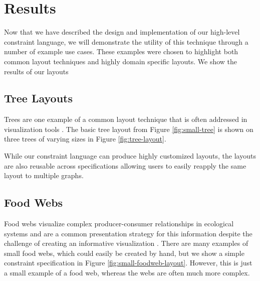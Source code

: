 \section{Results}
Now that we have described the design and implementation of our high-level constraint language, we will demonstrate the utility of this technique through a number of example use cases. These examples were chosen to highlight both common layout techniques and highly domain specific layouts. We show the results of our layouts 



\subsection{Tree Layouts}
\treeLayout
\tlrFourLayout
Trees are one example of a common layout technique that is often addressed in visualization tools . The basic tree layout from Figure \ref{fig:small-tree} is shown on three trees of varying sizes in Figure \ref{fig:tree-layout}.

While our constraint language can produce highly customized layouts, the layouts are also reusable across specifications allowing users to easily reapply the same layout to multiple graphs.

\subsection{Food Webs}
\smallFoodWebLayout
Food webs visualize complex producer-consumer relationships in ecological systems and are a common presentation strategy for this information despite the challenge of creating an informative visualization . There are many examples of small food webs, which could easily be created by hand, but we show a simple constraint specification in Figure \ref{fig:small-foodweb-layout}. However, this is just a small example of a food web, whereas the webs are often much more complex. 

